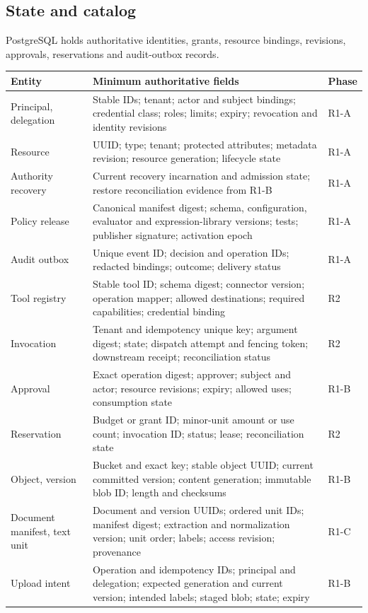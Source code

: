 \documentclass[11pt,a4paper]{article}
\begin{document}
\subsection{State and catalog}
PostgreSQL holds authoritative identities, grants, resource bindings, revisions, approvals, reservations and audit-outbox records.
\begin{longtable}{@{}P{0.20\textwidth}P{0.62\textwidth}P{0.08\textwidth}@{}}
\toprule Entity & Minimum authoritative fields & Phase\\\midrule\endhead
Principal, delegation & Stable IDs; tenant; actor and subject bindings; credential class; roles; limits; expiry; revocation and identity revisions & R1-A\\
Resource & UUID; type; tenant; protected attributes; metadata revision; resource generation; lifecycle state & R1-A\\
Authority recovery & Current recovery incarnation and admission state; restore reconciliation evidence from R1-B & R1-A\\
Policy release & Canonical manifest digest; schema, configuration, evaluator and expression-library versions; tests; publisher signature; activation epoch & R1-A\\
Audit outbox & Unique event ID; decision and operation IDs; redacted bindings; outcome; delivery status & R1-A\\
Tool registry & Stable tool ID; schema digest; connector version; operation mapper; allowed destinations; required capabilities; credential binding & R2\\
Invocation & Tenant and idempotency unique key; argument digest; state; dispatch attempt and fencing token; downstream receipt; reconciliation status & R2\\
Approval & Exact operation digest; approver; subject and actor; resource revisions; expiry; allowed uses; consumption state & R1-B\\
Reservation & Budget or grant ID; minor-unit amount or use count; invocation ID; status; lease; reconciliation state & R2\\
Object, version & Bucket and exact key; stable object UUID; current committed version; content generation; immutable blob ID; length and checksums & R1-B\\
Document manifest, text unit & Document and version UUIDs; ordered unit IDs; manifest digest; extraction and normalization version; unit order; labels; access revision; provenance & R1-C\\
Upload intent & Operation and idempotency IDs; principal and delegation; expected generation and current version; intended labels; staged blob; state; expiry & R1-B\\

\end{longtable}
\end{document}

